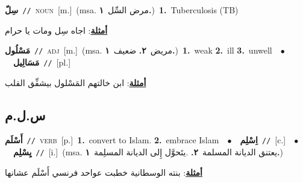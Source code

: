 \documentclass[10pt,a4paper,twoside]{article} %
\begin{document}
\begin{multicols}{2}
{\setlength\topsep{0pt}\textbf{\foreignlanguage{arabic}{سِلّ}}\ {\color{gray}\texttt{//}\color{black}}\ \textsc{noun}\ [m.]\ \color{gray}(msa. \foreignlanguage{arabic}{مرض السِّل}~\foreignlanguage{arabic}{\textbf{١.}})\color{black}\ \textbf{1.}~Tuberculosis (TB)\  \begin{flushright}\color{gray}\foreignlanguage{arabic}{\textbf{\underline{\foreignlanguage{arabic}{أمثلة}}}: اجاه سِل ومات يا حرام}\end{flushright}\color{black}} \vspace{2mm}

{\setlength\topsep{0pt}\textbf{\foreignlanguage{arabic}{مَسْلُول}}\ {\color{gray}\texttt{//}\color{black}}\ \textsc{adj}\ [m.]\ \color{gray}(msa. \foreignlanguage{arabic}{مريض}~\foreignlanguage{arabic}{\textbf{٢.}}  \foreignlanguage{arabic}{ضعيف}~\foreignlanguage{arabic}{\textbf{١.}})\color{black}\ \textbf{1.}~weak  \textbf{2.}~ill  \textbf{3.}~unwell\ \ $\bullet$\ \ \setlength\topsep{0pt}\textbf{\foreignlanguage{arabic}{مَسَالِيل}}\ {\color{gray}\texttt{//}\color{black}}\ [pl.]\  \begin{flushright}\color{gray}\foreignlanguage{arabic}{\textbf{\underline{\foreignlanguage{arabic}{أمثلة}}}: ابن خالتهم المَسْلول بيشفِّق القلب}\end{flushright}\color{black}} \vspace{2mm}

\vspace{-3mm}
\subsection*{\color{blue}\foreignlanguage{arabic}{س.ل.م}\color{blue}{}} 

{\setlength\topsep{0pt}\textbf{\foreignlanguage{arabic}{أَسْلَم}}\ {\color{gray}\texttt{//}\color{black}}\ \textsc{verb}\ [p.]\ \textbf{1.}~convert to Islam.  \textbf{2.}~embrace Islam\ \ $\bullet$\ \ \setlength\topsep{0pt}\textbf{\foreignlanguage{arabic}{اِسْلِم}}\ {\color{gray}\texttt{//}\color{black}}\ [c.]\ \ $\bullet$\ \ \setlength\topsep{0pt}\textbf{\foreignlanguage{arabic}{يِسْلِم}}\ {\color{gray}\texttt{//}\color{black}}\ [i.]\ \color{gray}(msa. \foreignlanguage{arabic}{يعتنق الديانة المسلمة}~\foreignlanguage{arabic}{\textbf{٢.}}  .\foreignlanguage{arabic}{يتَحوَّل إِلى الديانة المسلِمة}~\foreignlanguage{arabic}{\textbf{١.}})\color{black}\  \begin{flushright}\color{gray}\foreignlanguage{arabic}{\textbf{\underline{\foreignlanguage{arabic}{أمثلة}}}: بنته الوسطانية خطبت عواحد فرنسي أَسْلَم عشانها}\end{flushright}\color{black}} \vspace{2mm}


\end{multicols}
\end{document}
